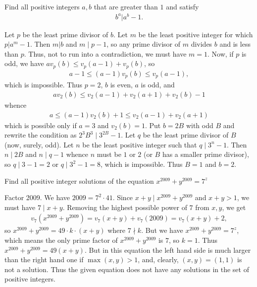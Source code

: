 \documentclass[main.tex]{subfile}
\begin{document}
    \begin{problem}
        Find all positive integers $a,b$ that are greater than $1$ and satisfy
        	\begin{align*}
	        	b^a | a^b-1.
        	\end{align*}
    \end{problem}
    
    \begin{solution}
        Let $p$ be the least prime divisor of $b$. Let $m$ be the least positive integer for which $p|a^m-1$. Then $m|b$ and $m\mid p-1$, so any prime divisor of $m$ divides $b$ and is less than $p$. Thus, not to run into a contradiction, we must have $m=1$. Now, if $p$ is odd, we have $av_p(b)\le v_p(a-1)+v_p(b)$, so
        	\begin{align*}
	        	a-1\le (a-1)v_p(b)\le v_p(a-1),
        	\end{align*}
        which is impossible. Thus $p=2$, $b$ is even, $a$ is odd, and
        	\begin{align*}
        		av_2(b)\le v_2(a-1)+v_2(a+1)+v_2(b)-1
        	\end{align*}
        whence
        	\begin{align*}
        		a\le (a-1)v_2(b)+1\le v_2(a-1)+v_2(a+1)
        	\end{align*} 
        which is possible only if $a=3$ and $v_2(b)=1$. Put $b=2B$ with odd $B$ and rewrite the condition as $2^3B^3\mid 3^{2B}-1$. Let $q$ be the least prime divisor of $B$ (now, surely, odd). Let $n$ be the least positive integer such that $q\mid 3^n-1$. Then $n\mid 2B$ and $n\mid q-1$ whence $n$ must be $1$ or $2$ (or $B$ has a smaller prime divisor), so $q\mid 3-1=2$ or $q\mid 3^2-1=8$, which is impossible. Thus $B=1$ and $b=2$.
    \end{solution}

    \begin{problem}
        Find all positive integer solutions of the equation $ x^{2009} + y^{2009} = 7^z$
    \end{problem}

    \begin{solution}
        Factor 2009. We have $2009 = 7^2\cdot 41$. Since $x+y\mid x^{2009}+y^{2009}$ and $x+y>1$, we must have $7 \mid x+ y$. Removing the highest possible power of $7$ from $x, y$, we get
        	\begin{align*}
        		v_7(x^{2009} + y^{2009}) = v_7(x + y)+ v_7(2009) = v_7(x +y) +2,
        	\end{align*}
        so $x^{2009} + y^{2009} = 49\cdot k\cdot (x + y)$ where $7\nmid k$. But we have $x^{2009} + y^{2009} = 7^z$, which means the only prime factor of $x^{2009} + y^{2009}$ is $7$, so $k=1$. Thus $x^{2009} + y^{2009} = 49(x + y)$.  But in this equation the left hand side is much larger than the right hand one if $\max(x, y) > 1$, and, clearly, $(x, y) = (1, 1)$ is not a solution. Thus the given equation does not have any solutions in the set of positive integers.
    \end{solution}
\end{document}
